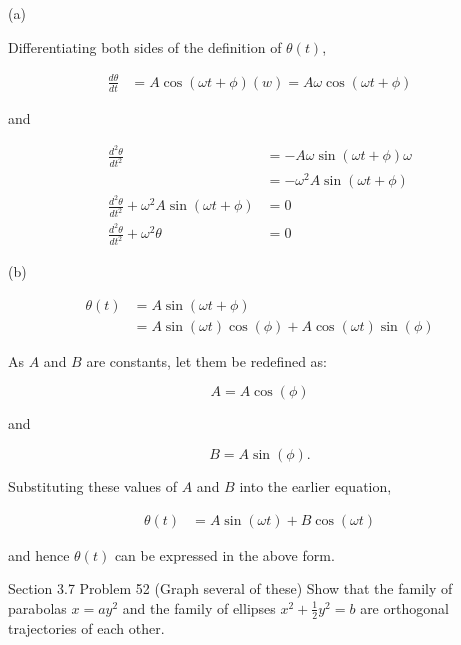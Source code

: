 \documentclass{article}
\begin{document}
    (a)


    Differentiating both sides of the definition of $\theta(t)$,

    \begin{align*}
        \frac{d\theta}{dt}  &= A\cos{(\omega t + \phi)}(w) = A\omega \cos{(\omega t + \phi)}
    \end{align*}

    and

    \begin{align*}
        \frac{d^2 \theta}{dt^2}                                     &= -A\omega\sin{(\omega t + \phi)}{\omega} \\
                                                                    &= -\omega ^2 A\sin{(\omega t + \phi)} \\
        \frac{d^2 \theta}{dt^2} + \omega ^2 A\sin{(\omega t + \phi)}  &= 0 \\
        \frac{d^2 \theta}{dt^2} + \omega ^2 \theta                  &= 0
    \end{align*}

    \pagebreak
    \thispagestyle{page10}

    (b)

    \begin{align*}
        \theta (t)  &= A\sin{(\omega t + \phi)} \\
                    &= A\sin{(\omega t)}\cos{(\phi)} + A\cos{(\omega t)}\sin{(\phi)}
    \end{align*}

    As $A$ and $B$ are constants, let them be redefined as:

    \[
        A = A\cos(\phi)
    \]

    and

    \[
        B = A\sin(\phi).
    \]

    Substituting these values of $A$ and $B$ into the earlier equation,

    \begin{align*}
        \theta(t)   &= A\sin{(\omega t)} + B\cos{(\omega t)}
    \end{align*}

    and hence $\theta(t)$ can be expressed in the above form.



    \begin{tbhtheorem}{Section 3.7 Problem 52 (Graph several of these)}
        Show that the family of parabolas $x = ay^2$ and the family of ellipses $x^2 + \frac{1}{2}y^2 = b$ are orthogonal trajectories of each other.
    \end{tbhtheorem}
\end{document}
